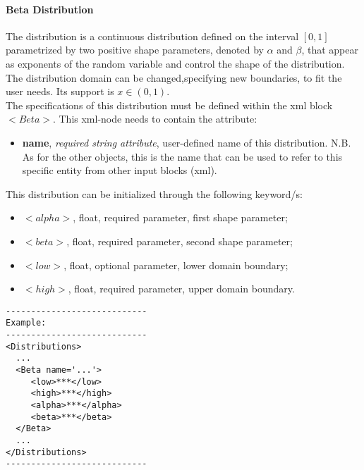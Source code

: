 \paragraph{Beta Distribution}
\label{Beta}
The  distribution is a continuous distribution  defined on the interval $[0, 1]$ parametrized by two positive shape parameters, denoted by $\alpha$ and $\beta$, that appear as exponents of the random variable and control the shape of the distribution. The distribution domain  can be changed,specifying new boundaries, to fit the user needs.  Its support is $x \in (0, 1)$.
\\ The specifications of this distribution must be defined within the xml block $<Beta>$. This xml-node needs to contain the attribute:
\vspace{-5mm}
\begin{itemize}
\itemsep0em
\item \textbf{name}, \textit{required string attribute}, user-defined name of this distribution. N.B. As for the other objects, this is the name that can be used to refer to this specific entity from other input blocks (xml).   
\end{itemize}
\vspace{-5mm}
This distribution can be initialized through the following keyword/s:
\begin{itemize}
\item $<alpha>$, float, required parameter, first shape parameter;
\item $<beta>$, float, required parameter, second shape parameter;
\item $<low>$, float, optional parameter,  lower domain boundary;  
\item $<high>$, float, required parameter, upper domain boundary.
\end{itemize}

\begin{lstlisting}[style=XML]
----------------------------
Example:
----------------------------
<Distributions>
  ...
  <Beta name='...'>
     <low>***</low>
     <high>***</high>
     <alpha>***</alpha>
     <beta>***</beta>
  </Beta>
  ...
</Distributions>
----------------------------
\end{lstlisting}



